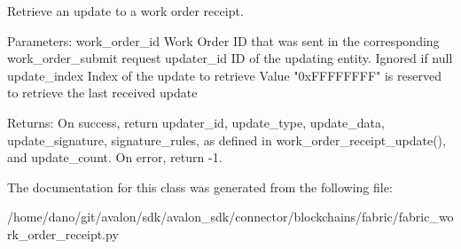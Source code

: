 \begin{DoxyVerb}Retrieve an update to a work order receipt.

Parameters:
work_order_id Work Order ID that was sent in the
      corresponding work_order_submit request
updater_id    ID of the updating entity. Ignored if null
update_index  Index of the update to retrieve
      Value "0xFFFFFFFF" is reserved to retrieve the
      last received update

Returns:
On success, return updater_id, update_type, update_data,
update_signature, signature_rules, as defined in
work_order_receipt_update(), and update_count.
On error, return -1.
\end{DoxyVerb}
 

The documentation for this class was generated from the following file\+:\begin{DoxyCompactItemize}
\item 
/home/dano/git/avalon/sdk/avalon\+\_\+sdk/connector/blockchains/fabric/fabric\+\_\+work\+\_\+order\+\_\+receipt.\+py\end{DoxyCompactItemize}
